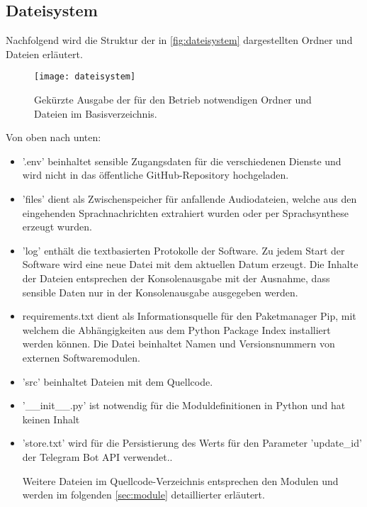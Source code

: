 \subsection{Dateisystem}

Nachfolgend wird die Struktur der in \autoref{fig:dateisystem} dargestellten Ordner und Dateien erläutert.

\begin{figure}[h!]
\centering
\texttt{[image: dateisystem]}
\caption{Gekürzte Ausgabe der für den Betrieb notwendigen Ordner und Dateien im Basisverzeichnis.}
\label{fig:dateisystem}
\end{figure}

\newpage

Von oben nach unten: 

\begin{itemize}
\item '.env' beinhaltet sensible Zugangsdaten für die verschiedenen Dienste und wird nicht in das öffentliche GitHub-Repository hochgeladen. 
\item 'files' dient als Zwischenspeicher für anfallende Audiodateien, welche aus den eingehenden Sprachnachrichten extrahiert wurden oder per Sprachsynthese erzeugt wurden. 
\item 'log' enthält die textbasierten Protokolle der Software. Zu jedem Start der Software wird eine neue Datei mit dem aktuellen Datum erzeugt. Die Inhalte der Dateien entsprechen der Konsolenausgabe mit der Ausnahme, dass sensible Daten nur in der Konsolenausgabe ausgegeben werden. 
\item requirements.txt dient als Informationsquelle für den Paketmanager Pip, mit welchem die Abhängigkeiten aus dem Python Package Index installiert werden können. Die Datei beinhaltet Namen und Versionsnummern von externen Softwaremodulen. 
\item 'src' beinhaltet Dateien mit dem Quellcode. 
\item '\_\_init\_\_.py' ist notwendig für die Moduldefinitionen in Python und hat keinen Inhalt 
\item 'store.txt' wird für die Persistierung des Werts für den Parameter 'update\_id' der Telegram Bot API verwendet.\cite[S. 337]{python}.

Weitere Dateien im Quellcode-Verzeichnis entsprechen den Modulen und werden im folgenden \autoref{sec:module} detaillierter erläutert. 

\end{itemize}

\enlargethispage{0.5cm} 

